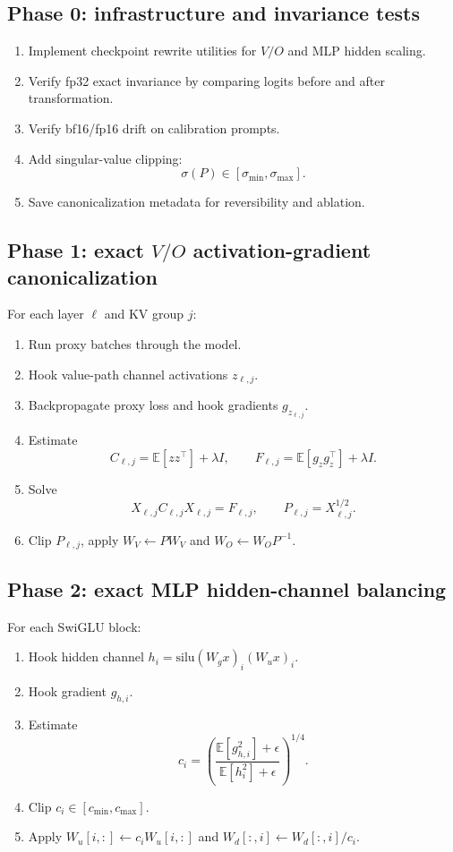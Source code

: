 \documentclass[11pt]{article}
\newcommand{\E}{\mathbb{E}}
\begin{document}
\subsection{Phase 0: infrastructure and invariance tests}

\begin{enumerate}[leftmargin=*]
    \item Implement checkpoint rewrite utilities for $V/O$ and MLP hidden scaling.
    \item Verify fp32 exact invariance by comparing logits before and after transformation.
    \item Verify bf16/fp16 drift on calibration prompts.
    \item Add singular-value clipping:
    \[
        \sigma(P)\in[\sigma_{\min},\sigma_{\max}].
    \]
    \item Save canonicalization metadata for reversibility and ablation.
\end{enumerate}

\subsection{Phase 1: exact $V/O$ activation-gradient canonicalization}

For each layer $\ell$ and KV group $j$:
\begin{enumerate}[leftmargin=*]
    \item Run proxy batches through the model.
    \item Hook value-path channel activations $z_{\ell,j}$.
    \item Backpropagate proxy loss and hook gradients $g_{z_{\ell,j}}$.
    \item Estimate
    \[
        C_{\ell,j}=\E[zz^\top]+\lambda I,
        \qquad
        F_{\ell,j}=\E[g_zg_z^\top]+\lambda I.
    \]
    \item Solve
    \[
        X_{\ell,j}C_{\ell,j}X_{\ell,j}=F_{\ell,j},
        \qquad
        P_{\ell,j}=X_{\ell,j}^{1/2}.
    \]
    \item Clip $P_{\ell,j}$, apply $W_V\leftarrow PW_V$ and $W_O\leftarrow W_OP^{-1}$.
\end{enumerate}

\subsection{Phase 2: exact MLP hidden-channel balancing}

For each SwiGLU block:
\begin{enumerate}[leftmargin=*]
    \item Hook hidden channel $h_i=\mathrm{silu}(W_gx)_i(W_ux)_i$.
    \item Hook gradient $g_{h,i}$.
    \item Estimate
    \[
        c_i=\left(\frac{\E[g_{h,i}^2]+\epsilon}{\E[h_i^2]+\epsilon}\right)^{1/4}.
    \]
    \item Clip $c_i\in[c_{\min},c_{\max}]$.
    \item Apply $W_u[i,:]\leftarrow c_iW_u[i,:]$ and $W_d[:,i]\leftarrow W_d[:,i]/c_i$.
\end{enumerate}
\end{document}
